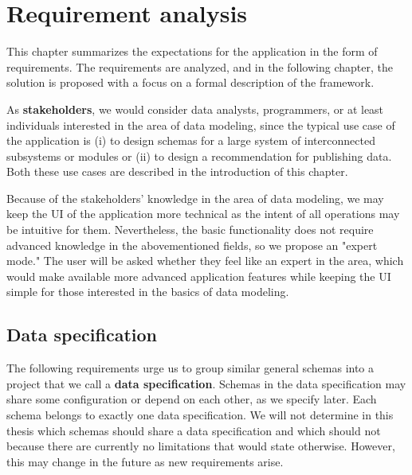 \chapter{Requirement analysis}\label{chapters:analysis}

This chapter summarizes the expectations for the application in the form of requirements. The requirements are analyzed, and in the following chapter, the solution is proposed with a focus on a formal description of the framework.

\bigskip

As \textbf{stakeholders}, we would consider data analysts, programmers, or at least individuals interested in the area of data modeling, since the typical use case of the application is (i) to design schemas for a large system of interconnected subsystems or modules or (ii) to design a recommendation for publishing data. Both these use cases are described in the introduction of this chapter.

Because of the stakeholders' knowledge in the area of data modeling, we may keep the UI of the application more technical as the intent of all operations may be intuitive for them. Nevertheless, the basic functionality does not require advanced knowledge in the abovementioned fields, so we propose an "expert mode." The user will be asked whether they feel like an expert in the area, which would make available more advanced application features while keeping the UI simple for those interested in the basics of data modeling.

\bigskip






\bigskip





\section{Data specification}

The following requirements urge us to group similar general schemas into a project that we call a \textbf{data specification}. Schemas in the data specification may share some configuration or depend on each other, as we specify later. Each schema belongs to exactly one data specification. We will not determine in this thesis which schemas should share a data specification and which should not because there are currently no limitations that would state otherwise. However, this may change in the future as new requirements arise.

